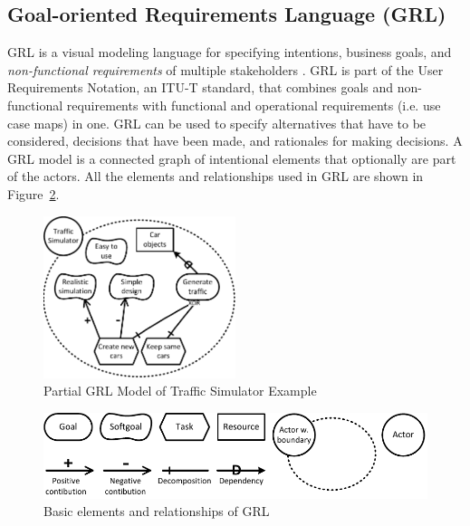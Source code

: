 \subsection{Goal-oriented Requirements Language (GRL)}
\label{sect:background:grl}
GRL is a visual modeling language for specifying intentions, business goals, and \emph{non-functional requirements} of multiple stakeholders \cite{Amyot:2010:EGM:1841349.1841356}. GRL is part of the User Requirements Notation, an ITU-T standard, that combines goals and non-functional requirements with functional and operational requirements (i.e. use case maps) in one. GRL can be used to specify alternatives that have to be considered, decisions that have been made, and rationales for making decisions. A GRL model is a connected graph of intentional elements that optionally are part of the actors. All the elements and relationships used in GRL are shown in Figure~\ref{fig:grl_legend}.

\begin{figure}[ht]
\centering
\includegraphics[width=0.5\textwidth]{img/Example1}
\caption{Partial GRL Model of Traffic Simulator Example} %
\label{fig:example-small}
\end{figure} %

\begin{figure}[ht]
\centering
\includegraphics[scale=0.6]{img/grl_legend}
\caption{Basic elements and relationships of GRL}
\label{fig:grl_legend}
\end{figure}

